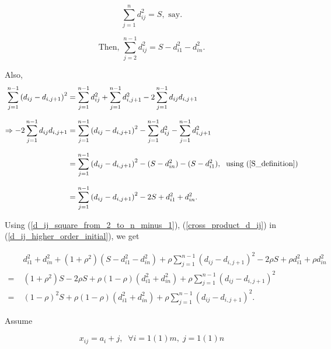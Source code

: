 \documentclass[11pt, a4paper]{article}
\begin{document}
\begin{itemize}
\begin{equation}\label{S_definition}
\sum \limits_{j = 1}^{n} d_{ij}^2 = S, \text{ say}.
\end{equation}

\begin{equation}\label{d_ij_square_from_2_to_n_minus_1}
\text{Then, } \sum \limits_{j = 2}^{n-1} d_{ij}^2 = S - d_{i1}^2 - d_{in}^2.
\end{equation}

Also,
\begin{align}\label{cross_product_d_ij}
\sum\limits_{j=1}^{n-1} \left(d_{ij} - d_{i,j+1}\right)^2 &= \sum\limits_{j=1}^{n-1} d_{ij}^2 + \sum\limits_{j=1}^{n-1} d_{i,j+1}^2
- 2 \sum\limits_{j=1}^{n-1} d_{ij} d_{i,j+1} \nonumber \\[0.7em]
\Rightarrow - 2 \sum\limits_{j=1}^{n-1} d_{ij} d_{i,j+1} &= \sum\limits_{j=1}^{n-1} \left(d_{ij} - d_{i,j+1}\right)^2 - \sum\limits_{j=1}^{n-1} d_{ij}^2 - \sum\limits_{j=1}^{n-1} d_{i,j+1}^2 \nonumber \\[0.7em]
&= \sum\limits_{j=1}^{n-1} \left(d_{ij} - d_{i,j+1}\right)^2 - (S - d_{in}^2) - (S - d_{i1}^2), \; \text{ using (\ref{S_definition})} \nonumber \\[0.7em]
&= \sum\limits_{j=1}^{n-1} \left(d_{ij} - d_{i,j+1}\right)^2 - 2S  + d_{i1}^2 + d_{in}^2.
\end{align}

Using (\ref{d_ij_square_from_2_to_n_minus_1}), (\ref{cross_product_d_ij}) in (\ref{d_ij_higher_order_initial}), we get

\begin{align}\label{d_ij_higher_order_simplified}
&d_{i1}^2 + d_{in}^2 + (1+\rho^2) (S - d_{i1}^2 - d_{in}^2) + \rho \sum\limits_{j=1}^{n-1} \left(d_{ij} - d_{i,j+1}\right)^2 - 2\rho S  + \rho d_{i1}^2 + \rho d_{in}^2 \nonumber \\[0.7em]
=\; &(1+\rho^2) S - 2\rho S + \rho (1 - \rho) (d_{i1}^2 + d_{in}^2) + \rho \sum\limits_{j=1}^{n-1} \left(d_{ij} - d_{i,j+1}\right)^2 \nonumber \\[0.7em]
=\; &(1-\rho)^2S + \rho (1 - \rho) (d_{i1}^2 + d_{in}^2) + \rho \sum\limits_{j=1}^{n-1} \left(d_{ij} - d_{i,j+1}\right)^2.
\end{align}

{\fontsize{12}{20} \gloriahallelujahfont Assume}

\begin{equation}\label{assumption}
x_{ij} = a_i + j, \;\; \forall i = 1(1)m, \; j = 1(1)n
\end{equation}


\end{itemize}
\end{document}
